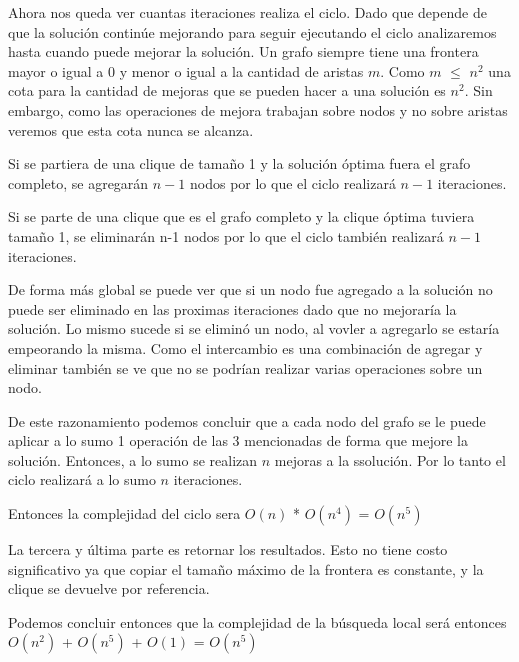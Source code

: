 Ahora nos queda ver cuantas iteraciones realiza el ciclo. Dado que depende de que la solución continúe mejorando para seguir ejecutando el ciclo analizaremos hasta cuando puede mejorar la solución. Un grafo siempre tiene una frontera mayor o igual a 0 y menor o igual a la cantidad de aristas $m$. Como $m$ $\leq$ $n^2$ una cota para la cantidad de mejoras que se pueden hacer a una solución es $n^2$. Sin embargo, como las operaciones de mejora trabajan sobre nodos y no sobre aristas veremos que esta cota nunca se alcanza.

Si se partiera de una clique de tamaño 1 y la solución óptima fuera el grafo completo, se agregarán $n-1$ nodos por lo que el ciclo realizará $n-1$ iteraciones.

Si se parte de una clique que es el grafo completo y la clique óptima tuviera tamaño 1, se eliminarán n-1 nodos por lo que el ciclo también realizará $n-1$ iteraciones.

De forma más global se puede ver que si un nodo fue agregado a la solución no puede ser eliminado en las proximas iteraciones dado que no mejoraría la solución. Lo mismo sucede si se eliminó un nodo, al vovler a agregarlo se estaría empeorando la misma. Como el intercambio es una combinación de agregar y eliminar también se ve que no se podrían realizar varias operaciones sobre un nodo.

De este razonamiento podemos concluir que a cada nodo del grafo se le puede aplicar a lo sumo 1 operación de las 3 mencionadas de forma que mejore la solución. Entonces, a lo sumo se realizan $n$ mejoras a la ssolución. Por lo tanto el ciclo realizará a lo sumo $n$ iteraciones.

Entonces la complejidad del ciclo sera $O(n)$ * $O(n^4)$ = $O(n^5)$

La tercera y última parte es retornar los resultados. Esto no tiene costo significativo ya que copiar el tamaño máximo de la frontera es constante, y la clique se devuelve por referencia.

Podemos concluir entonces que la complejidad de la búsqueda local será entonces $O(n^2)$ + $O(n^5)$ + $O(1)$ = $O(n^5)$